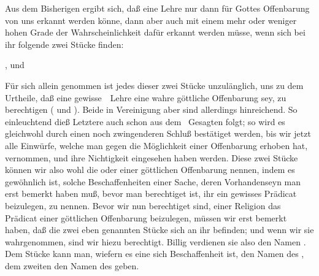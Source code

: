 Aus dem Bisherigen ergibt sich, daß eine Lehre nur dann für Gottes Offenbarung von uns erkannt werden könne, dann aber auch mit einem mehr oder weniger hohen Grade der Wahrscheinlichkeit dafür erkannt werden müsse, wenn sich bei ihr folgende zwei Stücke finden:
\begin{aufzb}
\item {}, und
\item {}
\end{aufzb}
Für sich allein genommen ist jedes dieser zwei Stücke unzulänglich, uns zu dem Urtheile, daß eine gewisse~\ Lehre eine wahre göttliche Offenbarung sey, zu berechtigen ( und ). Beide in Vereinigung aber sind allerdings hinreichend. So einleuchtend dieß Letztere auch schon aus dem \ Gesagten folgt; so wird es gleichwohl durch einen noch zwingenderen Schluß bestätiget werden, bis wir jetzt alle Einwürfe, welche man gegen die Möglichkeit einer Offenbarung erhoben hat, vernommen, und ihre Nichtigkeit eingesehen haben werden. Diese zwei Stücke können wir also wohl die  oder  einer göttlichen Offenbarung nennen, indem es gewöhnlich ist, solche Beschaffenheiten einer Sache, deren Vorhandenseyn man erst bemerkt haben muß, bevor man berechtiget ist, ihr ein gewisses Prädicat beizulegen,  zu nennen. Bevor wir nun berechtiget sind, einer Religion das Prädicat einer göttlichen Offenbarung beizulegen, müssen wir erst bemerkt haben, daß die zwei eben genannten Stücke sich an ihr befinden; und wenn wir sie wahrgenommen, sind wir hiezu berechtigt. Billig verdienen sie also den Namen . Dem  Stücke kann man, wiefern es eine sich  Beschaffenheit ist, den Namen des , dem zweiten den Namen des  geben.
